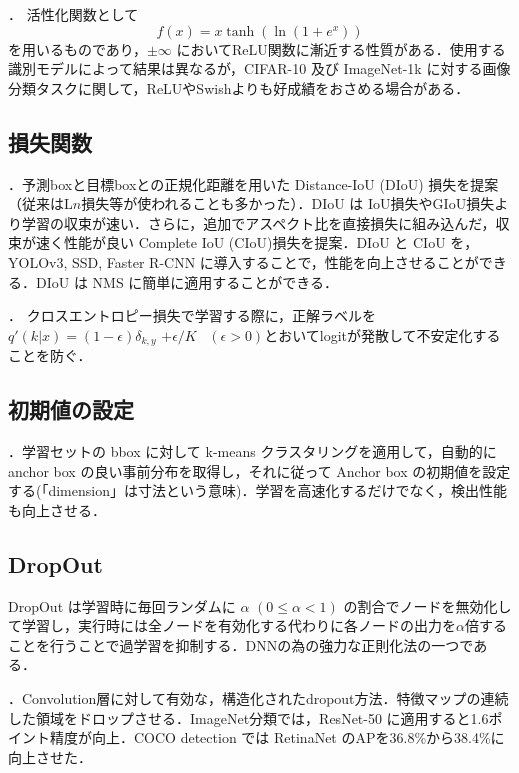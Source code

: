 \documentclass[originalpaper,fleqn]{jsaiart}     %
\begin{document}
\cite{Misra20}．
活性化関数として $$f(x) = x \tanh(\ln(1 + e^x))$$ を用いるものであり，$\pm\infty$ においてReLU関数に漸近する性質がある．使用する識別モデルによって結果は異なるが，CIFAR-10 及び ImageNet-1k に対する画像分類タスクに関して，ReLUやSwish\cite{RZL18}よりも好成績をおさめる場合がある．

\subsection{損失関数}
 \cite{ZWLLYR20}．予測boxと目標boxとの正規化距離を用いた Distance-IoU (DIoU) 損失を提案（従来はL$n$損失等が使われることも多かった）．DIoU は IoU損失やGIoU損失より学習の収束が速い．さらに，追加でアスペクト比を直接損失に組み込んだ，収束が速く性能が良い Complete IoU (CIoU)損失を提案．DIoU と CIoU を，YOLOv3, SSD\cite{LAESRFB16}, Faster R-CNN に導入することで，性能を向上させることができる．DIoU は NMS に簡単に適用することができる．

 \cite{SVISW16}．
クロスエントロピー損失で学習する際に，正解ラベルを $q'(k|x){=}(1{-}\epsilon)\delta_{k,y}$ 
${+}\epsilon/K$ \ $(\epsilon{>}0)$とおいてlogitが発散して不安定化することを防ぐ．

\subsection{初期値の設定}
 \cite{RedFar17}．学習セットの bbox に対して k-means クラスタリングを適用して，自動的に anchor box の良い事前分布を取得し，それに従って Anchor box の初期値を設定する(「dimension」は寸法という意味)．学習を高速化するだけでなく，検出性能も向上させる．

\subsection{DropOut}
DropOut\cite{SHKSS14} は学習時に毎回ランダムに $\alpha$ $(0\leq\alpha<1)$ の割合でノードを無効化して学習し，実行時には全ノードを有効化する代わりに各ノードの出力を$\alpha$倍することを行うことで過学習を抑制する．DNNの為の強力な正則化法の一つである．

 \cite{GLL18}．Convolution層に対して有効な，構造化されたdropout方法．特徴マップの連続した領域をドロップさせる．ImageNet分類では，ResNet-50 に適用すると1.6ポイント精度が向上．COCO detection では RetinaNet のAPを36.8\%から38.4\%に向上させた．
\end{document}
